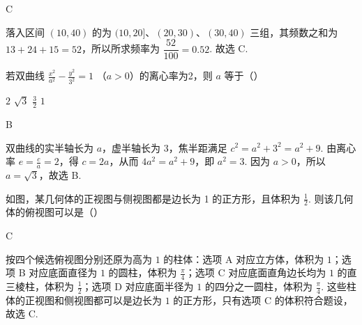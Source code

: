 \begin{answer}
C
\end{answer}

\begin{solution}
落入区间 \((10,40)\) 的为 \((10,20]\)、\((20,30)\)、\((30,40)\) 三组，其频数之和为 \(13+24+15=52\)，所以所求频率为 \(\dfrac{52}{100}=0.52\). 故选 C.
\end{solution}

\begin{problem}
若双曲线 \(\frac{x^2}{a^2} -\frac{y^2}{3^2} = 1 \) （\(a > 0\)）的离心率为2，则 \(a\) 等于（\quad）

\choices
    {\(2\)}
    {\(\sqrt{3}\)}
    {\( \frac{3}{2} \)}
    {\(1\)}
\end{problem}

\begin{answer}
B
\end{answer}

\begin{solution}
双曲线的实半轴长为 \(a\)，虚半轴长为 \(3\)，焦半距满足 \(c^2=a^2+3^2=a^2+9\). 由离心率 \(e=\frac{c}{a}=2\)，得 \(c=2a\)，从而 \(4a^2=a^2+9\)，即 \(a^2=3\). 因为 \(a>0\)，所以 \(a=\sqrt{3}\)，故选 B.
\end{solution}

\begin{problem}
如图，某几何体的正视图与侧视图都是边长为 1 的正方形，且体积为 \(\frac{1}{2}\). 则该几何体的俯视图可以是（\quad）


    {}
    {}
    {}
\end{problem}

\begin{answer}
C
\end{answer}

\begin{solution}
按四个候选俯视图分别还原为高为 \(1\) 的柱体：选项 A 对应立方体，体积为 \(1\)；选项 B 对应底面直径为 \(1\) 的圆柱，体积为 \(\frac{\pi}{4}\)；选项 C 对应底面直角边长均为 \(1\) 的直三棱柱，体积为 \(\frac{1}{2}\)；选项 D 对应底面半径为 \(1\) 的四分之一圆柱，体积为 \(\frac{\pi}{4}\). 这些柱体的正视图和侧视图都可以是边长为 \(1\) 的正方形，只有选项 C 的体积符合题设，故选 C.
\end{solution}

